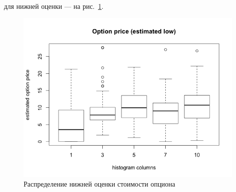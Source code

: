 \documentclass[specialist,
               substylefile = spbu.rtx,
               subf,href,colorlinks=true, 12pt]{disser}
\begin{document}
	для нижней оценки --- на рис.~\ref{fig:lowerEstimate}.
	\begin{figure}[h]
		\includegraphics[width=\textwidth]{lower_estimate}
		\caption{Распределение нижней оценки стоимости опциона}
		\label{fig:lowerEstimate}
	\end{figure}
\end{document}
